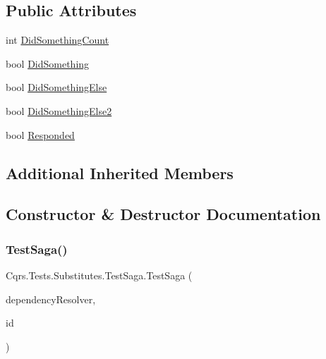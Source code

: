 \subsection*{Public Attributes}
\begin{DoxyCompactItemize}
\item 
int \hyperlink{classCqrs_1_1Tests_1_1Substitutes_1_1TestSaga_a8f2d9d216aeb1ffd3c8927a15c95f979}{Did\+Something\+Count}
\item 
bool \hyperlink{classCqrs_1_1Tests_1_1Substitutes_1_1TestSaga_aa906cfd8a91bf74c045932cced0c8da1}{Did\+Something}
\item 
bool \hyperlink{classCqrs_1_1Tests_1_1Substitutes_1_1TestSaga_a1aebc769db5e0266c536a39788af8799}{Did\+Something\+Else}
\item 
bool \hyperlink{classCqrs_1_1Tests_1_1Substitutes_1_1TestSaga_a77af339011080566a45a2682a486cb3b}{Did\+Something\+Else2}
\item 
bool \hyperlink{classCqrs_1_1Tests_1_1Substitutes_1_1TestSaga_a75ef0962453c0a012368cb524f745068}{Responded}
\end{DoxyCompactItemize}
\subsection*{Additional Inherited Members}


\subsection{Constructor \& Destructor Documentation}
\mbox{\label{classCqrs_1_1Tests_1_1Substitutes_1_1TestSaga_add3c932a45b03e651a09bc0df79fa267}} 
\subsubsection{\texorpdfstring{Test\+Saga()}{TestSaga()}}
{\footnotesize\ttfamily Cqrs.\+Tests.\+Substitutes.\+Test\+Saga.\+Test\+Saga (\begin{DoxyParamCaption}\item[{\hyperlink{interfaceCqrs_1_1Configuration_1_1IDependencyResolver}{I\+Dependency\+Resolver}}]{dependency\+Resolver,  }\item[{Guid}]{id }\end{DoxyParamCaption})}



